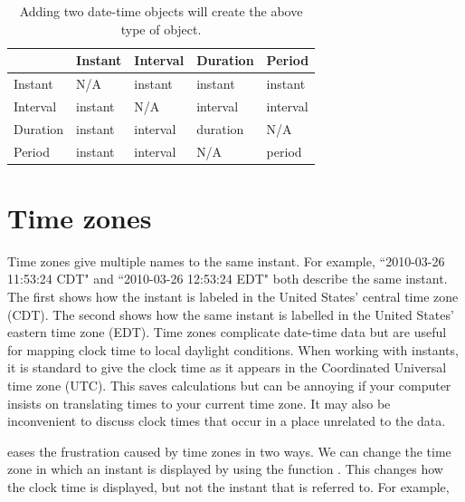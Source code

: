 \documentclass[article]{jss}
\begin{document}
\begin{table}
  \begin{center}
  \begin{tabular}{l|llll}
  & Instant & Interval & Duration & Period\\
  \hline
  Instant & N/A & instant & instant & instant\\
  Interval & instant & N/A & interval & interval\\
  Duration & instant & interval & duration & N/A\\
  Period & instant & interval & N/A & period\\
  \hline
    
  \end{tabular}
  \end{center}
  \caption{Adding two date-time objects will create the above type of object.}
  \label{tbl:date-math}
\end{table}

\section{Time zones}
\label{sec:tz}

Time zones give multiple names to the same instant. For example, ``2010-03-26 11:53:24 CDT" and ``2010-03-26 12:53:24 EDT" both describe the same instant. The first shows how the instant is labeled in the United States' central time zone (CDT). The second shows how the same instant is labelled in the United States' eastern time zone (EDT). Time zones complicate date-time data but are useful for mapping clock time to local daylight conditions. When working with instants, it is standard to give the clock time as it appears in the Coordinated Universal time zone (UTC).  This saves calculations but can be annoying if your computer insists on translating times to your current time zone.  It may also be inconvenient to discuss clock times that occur in a place unrelated to the data.

 eases the frustration caused by time zones in two ways. We can change the time zone in which an instant is displayed by using the function . This changes how the clock time is displayed, but not the instant that is referred to. For example,\\

\\
\\
\\
\\
\end{document}
